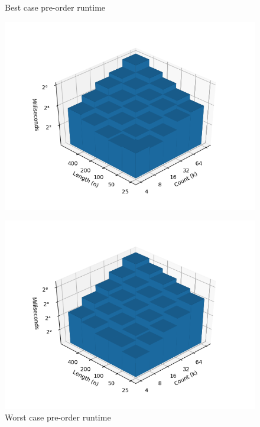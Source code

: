 \documentclass{bmcart}
\begin{document}
\begin{backmatter}
	\begin{figure}[h]
		\centering
		\begin{minipage}{0.48\textwidth}
			\centering
			\caption{Best case pre-order runtime}
			\label{Fig:Best}
			\includegraphics[width=1.1\textwidth]{pathological-12-preorder.png}
		\end{minipage}
		\hfill
		\begin{minipage}{0.48\textwidth}
			\centering
			\caption{Worst case pre-order runtime}
			\label{Fig:Worst}
			\includegraphics[width=1.1\textwidth]{pathological-31-preorder.png}
		\end{minipage}

		\begin{minipage}{0.48\textwidth}
			

\end{minipage}
\end{figure}
\end{backmatter}
\end{document}
